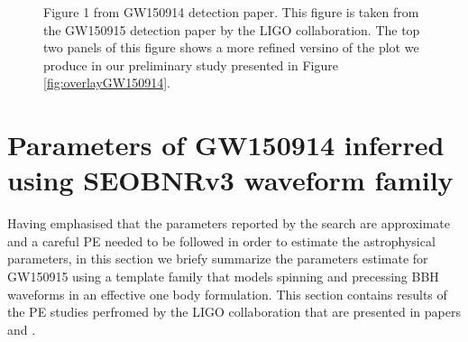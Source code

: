 \begin{figure}
\caption{Figure 1 from GW150914 detection paper. This figure is taken from the GW150915 detection paper \cite{gw150914detection} by the LIGO collaboration. The top two panels of this figure shows a more refined versino of the plot we produce in our preliminary study presented in Figure \ref{fig:overlayGW150914}.}
\label{fig:Fig1GW150914detection}
\end{figure}

\section{Parameters of GW150914 inferred using SEOBNRv3 waveform family}

Having emphasised that the parameters reported by the search are approximate and a careful PE needed to be followed in order to estimate the astrophysical parameters, in this section we briefy summarize the parameters estimate for GW150915 using a template family that models spinning and precessing BBH waveforms in an effective one body formulation. This section contains results of the PE studies perfromed by the LIGO collaboration that are presented in papers \cite{gw150914PE} and \cite{gw150914PEseobnrv3}.  

